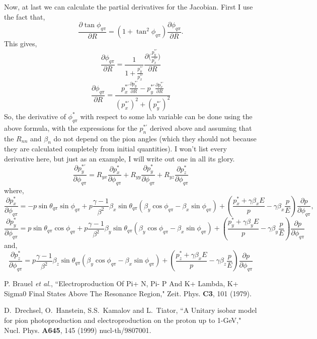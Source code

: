 Now, at last we can calculate the partial derivatives for the Jacobian.  First
I use the fact that,
$$
\frac{\partial{\tan{\phi_{q\pi}}}}{\partial{R}} = 
(1+\tan^2{\phi_{q\pi}})\frac{\partial{\phi_{q\pi}}}{\partial{R}}.
$$
This gives,
$$
\frac{\partial{\phi_{q\pi}}}{\partial{R}} = 
\frac{1}{1+\frac{p_y^{*'}}{p_x^{*'}}} 
\frac{ \partial{ (\frac{p_y^{*'}}{p_x^{*'}} }) }{\partial{R}}
$$
$$
\frac{\partial{\phi_{q\pi}}}{\partial{R}} =
\frac{p_x^{*'} \frac{\partial{p_y^{*'}}}{\partial{R}} - 
      p_y^{*'} \frac{\partial{p_x^{*'}}}{\partial{R}} }{(p_x^{*'})^2 + 
 (p_y^{*'})^2}
$$
So, the derivative of $\phi^*_{q\pi}$ with respect to some lab variable can
be done using the above formula, with the expressions for the $p_n^{*'}$ 
derived above and assuming that the $R_{nn}$ and $\beta_n$ do not depend on
the pion angles (which they should not because they are calculated completely
from initial quantities).  I won't list every derivative here, but just as an 
example, I will write out one in all its glory.
$$
\frac{ \partial{p_y^{*'}}}{\partial{\phi_{q\pi}}} = 
R_{yx}\frac{\partial{p_x^*}}{\partial{\phi_{q\pi}}} + 
R_{yy}\frac{\partial{p_y^*}}{\partial{\phi_{q\pi}}} +
R_{yz}\frac{\partial{p_z^*}}{\partial{\phi_{q\pi}}}
$$
where,
$$
\frac{\partial{p_x^*}}{\partial{\phi_{q\pi}}} = 
-p\sin{\theta_{q\pi}}\sin{\phi_{q\pi}} + 
p \frac{\gamma-1}{\beta^2} \beta_x \sin{\theta_{q\pi}} 
(\beta_y\cos{\phi_{q\pi}} - \beta_x\sin{\phi_{q\pi}}) + 
(\frac{p_x^*+\gamma\beta_xE}{p} - \gamma\beta_x\frac{p}{E})
\frac{\partial{p}}{\partial{\phi_{q\pi}}},
$$
$$
\frac{\partial{p_y^*}}{\partial{\phi_{q\pi}}} = 
p\sin{\theta_{q\pi}}\cos{\phi_{q\pi}} + 
p \frac{\gamma-1}{\beta^2} \beta_y \sin{\theta_{q\pi}} 
(\beta_y\cos{\phi_{q\pi}} - \beta_x\sin{\phi_{q\pi}}) + 
(\frac{p_y^*+\gamma\beta_yE}{p} - \gamma\beta_y\frac{p}{E})
\frac{\partial{p}}{\partial{\phi_{q\pi}}}
$$
and,
$$
\frac{\partial{p_z^*}}{\partial{\phi_{q\pi}}} = 
p \frac{\gamma-1}{\beta^2} \beta_z \sin{\theta_{q\pi}} 
(\beta_y\cos{\phi_{q\pi}} - \beta_x\sin{\phi_{q\pi}}) + 
(\frac{p_z^*+\gamma\beta_xE}{p} - \gamma\beta_z\frac{p}{E})
\frac{\partial{p}}{\partial{\phi_{q\pi}}}
$$

\begin{thebibliography}{99}
 P. Brauel {\it et al.},
``Electroproduction Of Pi+ N, Pi- P And K+ Lambda, K+ Sigma0 Final States
                  Above The Resonance Region,"
Zeit. Phys. {\bf C3}, 101 (1979).

D.~Drechsel, O.~Hanstein, S.S.~Kamalov and L.~Tiator,
``A Unitary isobar model for pion photoproduction and electroproduction on
                  the proton up to 1-GeV,"
Nucl. Phys. {\bf A645}, 145 (1999)
nucl-th/9807001.
\end{thebibliography}


